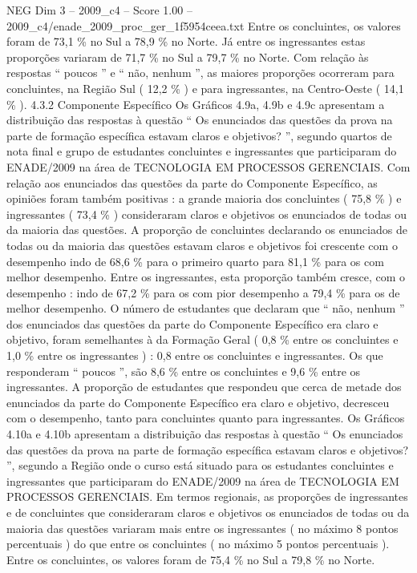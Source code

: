 \begin{textsample}{NEG Dim 3 – 2009\_c4 – Score 1.00 – 2009\_c4/enade\_2009\_proc\_ger\_1f5954ceea.txt}
Entre os concluintes, os valores foram de 73,1 \% no Sul a 78,9 \% no Norte.
Já entre os ingressantes estas proporções variaram de 71,7 \% no Sul a 79,7 \% no Norte.
Com relação às respostas “ poucos ” e “ não, nenhum ”, as maiores proporções ocorreram para concluintes, na Região Sul ( 12,2 \% ) e para ingressantes, na Centro-Oeste ( 14,1 \% ). 4.3.2 Componente Específico Os Gráficos 4.9a, 4.9b e 4.9c apresentam a distribuição das respostas à questão “ Os enunciados das questões da prova na parte de formação específica estavam claros e objetivos? ”, segundo quartos de nota final e grupo de estudantes concluintes e ingressantes que participaram do ENADE/2009 na área de TECNOLOGIA EM PROCESSOS GERENCIAIS.
Com relação aos enunciados das questões da parte do Componente Específico, as opiniões foram também positivas : a grande maioria dos concluintes ( 75,8 \% ) e ingressantes ( 73,4 \% ) consideraram claros e objetivos os enunciados de todas ou da maioria das questões.
A proporção de concluintes declarando os enunciados de todas ou da maioria das questões estavam claros e objetivos foi crescente com o desempenho indo de 68,6 \% para o primeiro quarto para 81,1 \% para os com melhor desempenho.
Entre os ingressantes, esta proporção também cresce, com o desempenho : indo de 67,2 \% para os com pior desempenho a 79,4 \% para os de melhor desempenho.
O número de estudantes que declaram que “ não, nenhum ” dos enunciados das questões da parte do Componente Específico era claro e objetivo, foram semelhantes à da Formação Geral ( 0,8 \% entre os concluintes e 1,0 \% entre os ingressantes ) : 0,8 entre os concluintes e ingressantes.
Os que responderam “ poucos ”, são 8,6 \% entre os concluintes e 9,6 \% entre os ingressantes.
A proporção de estudantes que respondeu que cerca de metade dos enunciados da parte do Componente Específico era claro e objetivo, decresceu com o desempenho, tanto para concluintes quanto para ingressantes.
Os Gráficos 4.10a e 4.10b apresentam a distribuição das respostas à questão “ Os enunciados das questões da prova na parte de formação específica estavam claros e objetivos? ”, segundo a Região onde o curso está situado para os estudantes concluintes e ingressantes que participaram do ENADE/2009 na área de TECNOLOGIA EM PROCESSOS GERENCIAIS.
Em termos regionais, as proporções de ingressantes e de concluintes que consideraram claros e objetivos os enunciados de todas ou da maioria das questões variaram mais entre os ingressantes ( no máximo 8 pontos percentuais ) do que entre os concluintes ( no máximo 5 pontos percentuais ).
Entre os concluintes, os valores foram de 75,4 \% no Sul a 79,8 \% no Norte.

\end{textsample}
